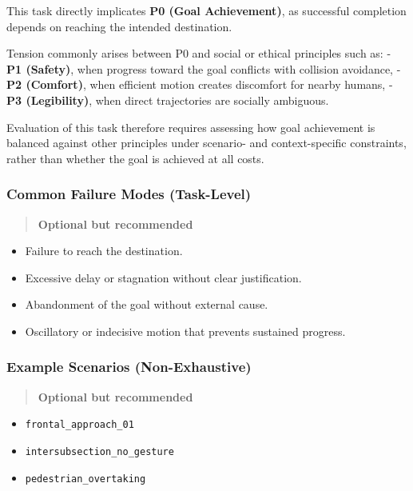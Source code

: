 \documentclass[utf8]{frontiers_suppmat} %
\providecommand{\tightlist}{%
  \setlength{\itemsep}{0pt}\setlength{\parskip}{0pt}}
\begin{document}
This task directly implicates \textbf{P0 (Goal Achievement)}, as
successful completion depends on reaching the intended destination.

Tension commonly arises between P0 and social or ethical principles such
as: - \textbf{P1 (Safety)}, when progress toward the goal conflicts with
collision avoidance, - \textbf{P2 (Comfort)}, when efficient motion
creates discomfort for nearby humans, - \textbf{P3 (Legibility)}, when
direct trajectories are socially ambiguous.

Evaluation of this task therefore requires assessing how goal
achievement is balanced against other principles under scenario- and
context-specific constraints, rather than whether the goal is achieved
at all costs.

\subsubsection{Common Failure Modes
(Task-Level)}\label{common-failure-modes-task-level}

\begin{quote}
\textbf{Optional but recommended}
\end{quote}

\begin{itemize}
\tightlist
\item
  Failure to reach the destination.
\item
  Excessive delay or stagnation without clear justification.
\item
  Abandonment of the goal without external cause.
\item
  Oscillatory or indecisive motion that prevents sustained progress.
\end{itemize}

\subsubsection{Example Scenarios
(Non-Exhaustive)}\label{example-scenarios-non-exhaustive}

\begin{quote}
\textbf{Optional but recommended}
\end{quote}

\begin{itemize}
\tightlist
\item
  \texttt{frontal\_approach\_01}
\item
  \texttt{intersubsection\_no\_gesture}
\item
  \texttt{pedestrian\_overtaking}
\end{itemize}
\end{document}
